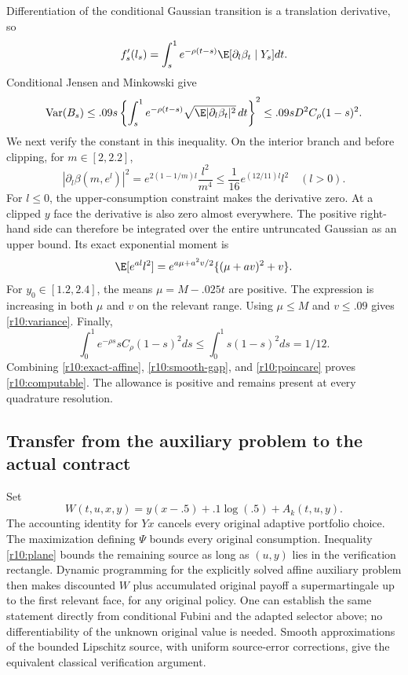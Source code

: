 Differentiation of the conditional Gaussian transition is a translation derivative, so
\[
 f_s'(l_s)=\int_s^1e^{-\rho(t-s)}\E[\partial_l\beta_t\mid Y_s]dt.
\]
Conditional Jensen and Minkowski give
\begin{equation}
 \operatorname{Var}(B_s)\leq .09s
 \left\{\int_s^1e^{-\rho(t-s)}\sqrt{\E|\partial_l\beta_t|^2}\,dt\right\}^2
 \leq .09sD^2C_\rho(1-s)^2.\label{r10:poincare}
\end{equation}
We next verify the constant in this inequality. On the interior branch and before clipping, for $m\in[2,2.2]$,
\[
 |\partial_l\beta(m,e^l)|^2
  =e^{2(1-1/m)l}\frac{l^2}{m^4}
  \leq\frac1{16}e^{(12/11)l}l^2\quad(l>0).
\]
For $l\leq0$, the upper-consumption constraint makes the derivative zero. At a clipped $y$ face the derivative is also zero almost everywhere. The positive right-hand side can therefore be integrated over the entire untruncated Gaussian as an upper bound. Its exact exponential moment is
\[
 \E[e^{al}l^2]=e^{a\mu+a^2v/2}\{(\mu+av)^2+v\}.
\]
For $y_0\in[1.2,2.4]$, the means $\mu=M-.025t$ are positive. The expression is increasing in both $\mu$ and $v$ on the relevant range. Using $\mu\leq M$ and $v\leq.09$ gives \eqref{r10:variance}. Finally,
\[
 \int_0^1e^{-\rho s}sC_\rho(1-s)^2ds
 \leq\int_0^1s(1-s)^2ds=1/12.
\]
Combining \eqref{r10:exact-affine}, \eqref{r10:smooth-gap}, and \eqref{r10:poincare} proves \eqref{r10:computable}. The allowance is positive and remains present at every quadrature resolution.

\subsection{Transfer from the auxiliary problem to the actual contract}
Set
\[
 W(t,u,x,y)=y(x-.5)+.1\log(.5)+A_k(t,u,y).
\]
The accounting identity for $Yx$ cancels every original adaptive portfolio choice. The maximization defining $\Psi$ bounds every original consumption. Inequality \eqref{r10:plane} bounds the remaining source as long as $(u,y)$ lies in the verification rectangle. Dynamic programming for the explicitly solved affine auxiliary problem then makes discounted $W$ plus accumulated original payoff a supermartingale up to the first relevant face, for any original policy. One can establish the same statement directly from conditional Fubini and the adapted selector above; no differentiability of the unknown original value is needed. Smooth approximations of the bounded Lipschitz source, with uniform source-error corrections, give the equivalent classical verification argument.

